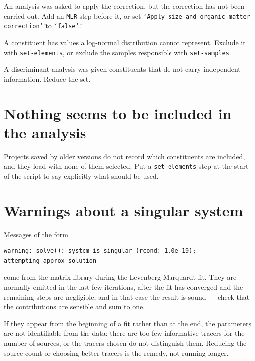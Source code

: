 \documentclass[11pt,a4paper]{report}
\newcommand{\dq}{\char`\"}
\begin{document}
\begin{sloppypar}
\begin{description}[style=nextline,leftmargin=0pt]
  \item[Perform Organic Matter and Size Correction first] An analysis was asked
    to apply the correction, but the correction has not been carried out. Add
    an \texttt{MLR} step before it, or set
    \texttt{\dq{}Apply size and organic matter correction\dq{}} to
    \texttt{\dq{}false\dq{}}.
  \item[Zero or negative values for element \ldots] A constituent has values a
    log-normal distribution cannot represent. Exclude it with
    \texttt{set-elements}, or exclude the samples responsible with
    \texttt{set-samples}.
  \item[Singular matrix in within group scatter matrix] A discriminant analysis
    was given constituents that do not carry independent information. Reduce
    the set.
\end{description}
\end{sloppypar}

\section{Nothing seems to be included in the analysis}

Projects saved by older versions do not record which constituents are included,
and they load with none of them selected. Put a \texttt{set-elements} step at
the start of the script to say explicitly what should be used.

\section{Warnings about a singular system}

Messages of the form

\begin{lstlisting}
warning: solve(): system is singular (rcond: 1.0e-19);
attempting approx solution
\end{lstlisting}

come from the matrix library during the Levenberg-Marquardt fit. They are
normally emitted in the last few iterations, after the fit has converged and
the remaining steps are negligible, and in that case the result is sound ---
check that the contributions are sensible and sum to one.

If they appear from the beginning of a fit rather than at the end, the
parameters are not identifiable from the data: there are too few informative
tracers for the number of sources, or the tracers chosen do not distinguish
them. Reducing the source count or choosing better tracers is the remedy, not
running longer.
\end{document}
